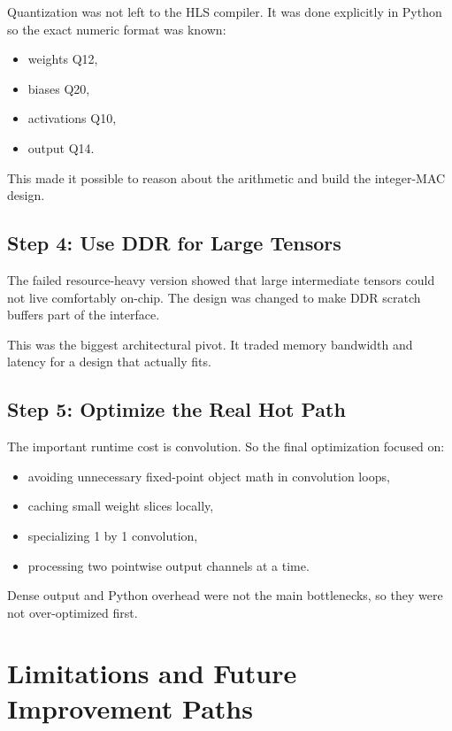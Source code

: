 \documentclass[11pt]{article}
\begin{document}
Quantization was not left to the HLS compiler.
It was done explicitly in Python so the exact numeric format was known:

\begin{itemize}[leftmargin=1.4em]
  \item weights Q12,
  \item biases Q20,
  \item activations Q10,
  \item output Q14.
\end{itemize}

This made it possible to reason about the arithmetic and build the integer-MAC design.

\subsection{Step 4: Use DDR for Large Tensors}

The failed resource-heavy version showed that large intermediate tensors could not live comfortably on-chip.
The design was changed to make DDR scratch buffers part of the interface.

This was the biggest architectural pivot.
It traded memory bandwidth and latency for a design that actually fits.

\subsection{Step 5: Optimize the Real Hot Path}

The important runtime cost is convolution.
So the final optimization focused on:

\begin{itemize}[leftmargin=1.4em]
  \item avoiding unnecessary fixed-point object math in convolution loops,
  \item caching small weight slices locally,
  \item specializing 1 by 1 convolution,
  \item processing two pointwise output channels at a time.
\end{itemize}

Dense output and Python overhead were not the main bottlenecks, so they were not over-optimized first.

\section{Limitations and Future Improvement Paths}
\end{document}
